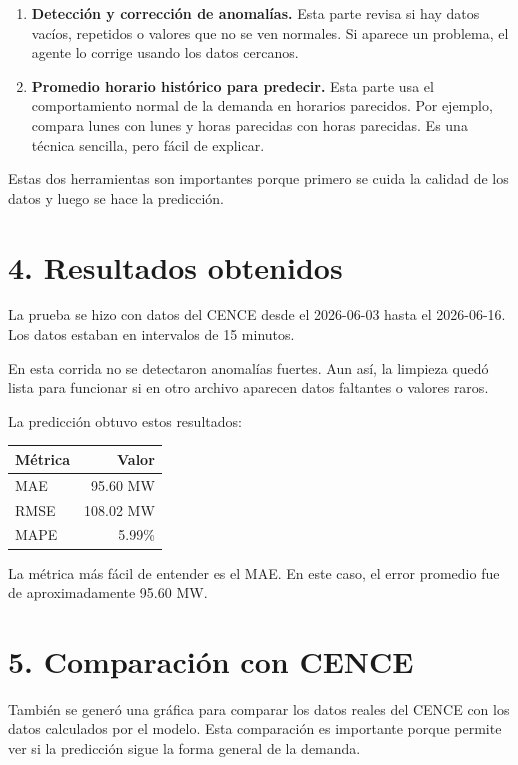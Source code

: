 \documentclass[11pt]{article}
\begin{document}
\begin{enumerate}
  \item \textbf{Detección y corrección de anomalías.} Esta parte revisa si hay datos vacíos, repetidos o valores que no se ven normales. Si aparece un problema, el agente lo corrige usando los datos cercanos.
  \item \textbf{Promedio horario histórico para predecir.} Esta parte usa el comportamiento normal de la demanda en horarios parecidos. Por ejemplo, compara lunes con lunes y horas parecidas con horas parecidas. Es una técnica sencilla, pero fácil de explicar.
\end{enumerate}

Estas dos herramientas son importantes porque primero se cuida la calidad de los datos y luego se hace la predicción.

\section*{4. Resultados obtenidos}

La prueba se hizo con datos del CENCE desde el 2026-06-03 hasta el 2026-06-16. Los datos estaban en intervalos de 15 minutos.

En esta corrida no se detectaron anomalías fuertes. Aun así, la limpieza quedó lista para funcionar si en otro archivo aparecen datos faltantes o valores raros.

La predicción obtuvo estos resultados:

\begin{center}
\begin{tabular}{lr}
\toprule
Métrica & Valor \\
\midrule
MAE & 95.60 MW \\
RMSE & 108.02 MW \\
MAPE & 5.99\% \\
\bottomrule
\end{tabular}
\end{center}

La métrica más fácil de entender es el MAE. En este caso, el error promedio fue de aproximadamente 95.60 MW.

\section*{5. Comparación con CENCE}

También se generó una gráfica para comparar los datos reales del CENCE con los datos calculados por el modelo. Esta comparación es importante porque permite ver si la predicción sigue la forma general de la demanda.
\end{document}
